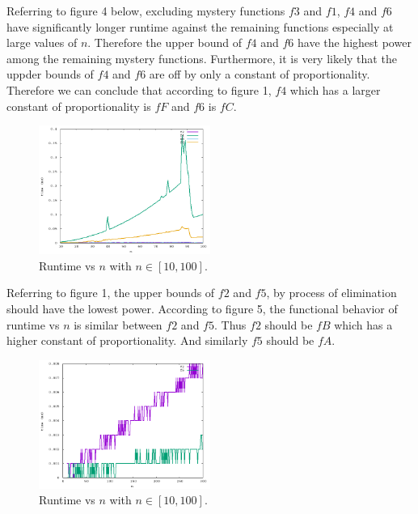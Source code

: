 \documentclass{article}
\begin{document}
	Referring to figure 4 below, excluding mystery functions $f3$ and $f1$, $f4$ and $f6$ have significantly longer runtime against the remaining functions especially at large values of $n$. Therefore the upper bound of $f4$ and $f6$ have the highest power among the remaining mystery functions. Furthermore, it is very likely that the uppder bounds of $f4$ and $f6$ are off by only a constant of proportionality. Therefore we can conclude that according to figure 1, $f4$ which has a larger constant of proportionality is $fF$ and $f6$ is $fC$.
	\begin{figure}[H]
		\begin{center}
			\includegraphics[width=0.5\textwidth]{Evidence_3.png}
		\end{center}
		\caption{Runtime vs $n$ with $n\in [10,100]$.}
	\end{figure}
	
	Referring to figure 1, the upper bounds of $f2$ and $f5$, by process of elimination should have the lowest power. According to figure 5, the functional behavior of runtime vs $n$ is similar between $f2$ and $f5$. Thus $f2$ should be $fB$ which has a higher constant of proportionality. And similarly $f5$ should be $fA$.
	\begin{figure}[H]
		\begin{center}
			\includegraphics[width=0.5\textwidth]{Evidence_4.png}
		\end{center}
		\caption{Runtime vs $n$ with $n\in [10,100]$.}
	\end{figure}
\end{document}
